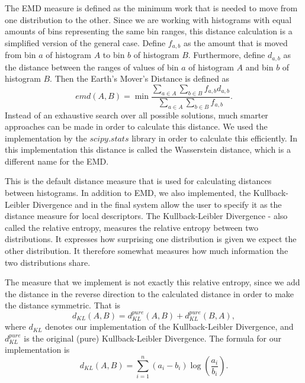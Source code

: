 The EMD measure is defined as the minimum work that is needed to move from one distribution to the other.
Since we are working with histograms with equal amounts of bins representing the same bin ranges, this distance calculation is a simplified version of the general case.
Define $f_{a, b}$ as the amount that is moved from bin $a$ of histogram $A$ to bin $b$ of histogram $B$.
Furthermore, define $d_{a, b}$ as the distance between the ranges of values of bin $a$ of histogram $A$ and bin $b$ of histogram $B$.
Then the Earth's Mover's Distance is defined as
\begin{equation}
    emd(A,B) = \min \frac{\sum_{a \in A} \sum_{b \in B} f_{a, b} d_{a, b}}{\sum_{a \in A} \sum_{b \in B} f_{a, b}}.
\end{equation}
Instead of an exhaustive search over all possible solutions, much smarter approaches can be made in order to calculate this distance.
We used the implementation by the $scipy.stats$ library in order to calculate this efficiently.
In this implementation this distance is called the Wasserstein distance, which is a different name for the EMD.

This is the default distance measure that is used for calculating distances between histograms.
In addition to EMD, we also implemented, the Kullback-Leibler Divergence \cite{kullback1951information} and in the final system allow the user to specify it as the distance measure for local descriptors.
The Kullback-Leibler Divergence - also called the relative entropy, measures the relative entropy between two distributions.
It expresses how surprising one distribution is given we expect the other distribution.
It therefore somewhat measures how much information the two distributions share.

The measure that we implement is not exactly this relative entropy, since we add the distance in the reverse direction to the calculated distance in order to make the distance symmetric.
That is
\begin{equation}
    d_{KL}(A, B) = d_{KL}^{pure}(A, B) + d_{KL}^{pure}(B, A),
\end{equation}
where $d_{KL}$ denotes our implementation of the Kullback-Leibler Divergence, and $d_{KL}^{pure}$ is the original (pure) Kullback-Leibler Divergence.
The formula for our implementation is
\begin{equation}
    d_{KL}(A, B) = \sum_{i=1}^n (a_i - b_i) \log \left( \frac{a_i}{b_i} \right).\label{eq:kl-d}
\end{equation}

